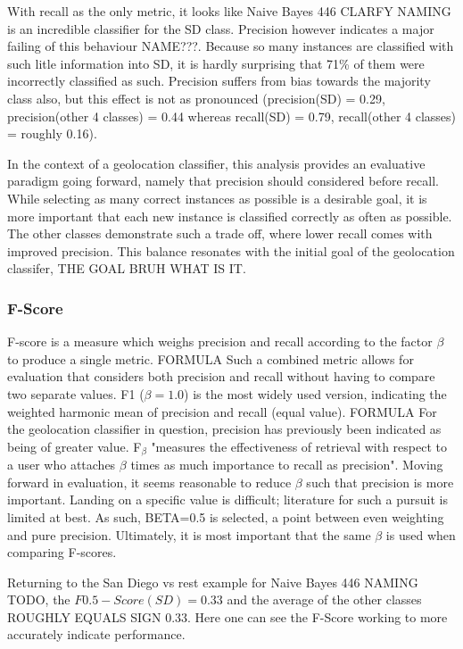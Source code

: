 \documentclass[twocolumn]{article}
\begin{document}
With recall as the only metric, it looks like Naive Bayes 446 CLARFY NAMING is an incredible classifier for the SD class. Precision however indicates a major failing of this behaviour NAME???. Because so many instances are classified with such litle information into SD, it is hardly surprising that 71\% of them were incorrectly classified as such. Precision suffers from bias towards the majority class also, but this effect is not as pronounced (precision(SD) = 0.29, precision(other 4 classes) = 0.44 whereas recall(SD) = 0.79, recall(other 4 classes) = roughly 0.16).

In the context of a geolocation classifier, this analysis provides an evaluative paradigm going forward, namely that precision should considered before recall. While selecting as many correct instances as possible is a desirable goal, it is more important that each new instance is classified correctly as often as possible. The other classes demonstrate such a trade off, where lower recall comes with improved precision. This balance resonates with the initial goal of the geolocation classifer, THE GOAL BRUH WHAT IS IT.

\subsubsection{F-Score}
F-score is a measure which weighs precision and recall according to the factor $\beta$ to produce a single metric.
FORMULA
Such a combined metric allows for evaluation that considers both precision and recall without having to compare two separate values. F1 ($\beta = 1.0$) is the most widely used version, indicating the weighted harmonic mean of precision and recall (equal value).
FORMULA
For the geolocation classifier in question, precision has previously been indicated as being of greater value. F$_\beta$ "measures the effectiveness of retrieval with respect to a user who attaches $\beta$ times as much importance to recall as precision". Moving forward in evaluation, it seems reasonable to reduce $\beta$ such that precision is more important. Landing on a specific value is difficult; literature for such a pursuit is limited at best. As such, BETA=0.5 is selected, a point between even weighting and pure precision. Ultimately, it is most important that the same $\beta$ is used when comparing F-scores.

Returning to the San Diego vs rest example for Naive Bayes 446 NAMING TODO, the $F0.5-Score(SD) = 0.33$ and the average of the other classes ROUGHLY EQUALS SIGN 0.33. Here one can see the F-Score working to more accurately indicate performance.
\end{document}
